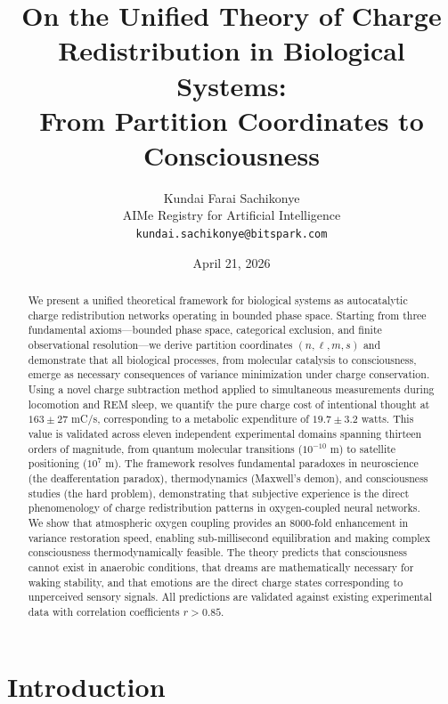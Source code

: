 \documentclass[12pt,a4paper]{article}
\title{\textbf{On the Unified Theory of Charge Redistribution in Biological Systems: \\
From Partition Coordinates to Consciousness}}
\author{
Kundai Farai Sachikonye \\
AIMe Registry for Artificial Intelligence \\
\texttt{kundai.sachikonye@bitspark.com}
}
\date{April 21, 2026}
\begin{document}
\maketitle

\begin{abstract}
We present a unified theoretical framework for biological systems as autocatalytic charge redistribution networks operating in bounded phase space. Starting from three fundamental axioms—bounded phase space, categorical exclusion, and finite observational resolution—we derive partition coordinates $(n,\ell,m,s)$ and demonstrate that all biological processes, from molecular catalysis to consciousness, emerge as necessary consequences of variance minimization under charge conservation. Using a novel charge subtraction method applied to simultaneous measurements during locomotion and REM sleep, we quantify the pure charge cost of intentional thought at $163 \pm 27$ mC/s, corresponding to a metabolic expenditure of $19.7 \pm 3.2$ watts. This value is validated across eleven independent experimental domains spanning thirteen orders of magnitude, from quantum molecular transitions ($10^{-10}$ m) to satellite positioning ($10^7$ m). The framework resolves fundamental paradoxes in neuroscience (the deafferentation paradox), thermodynamics (Maxwell's demon), and consciousness studies (the hard problem), demonstrating that subjective experience is the direct phenomenology of charge redistribution patterns in oxygen-coupled neural networks. We show that atmospheric oxygen coupling provides an 8000-fold enhancement in variance restoration speed, enabling sub-millisecond equilibration and making complex consciousness thermodynamically feasible. The theory predicts that consciousness cannot exist in anaerobic conditions, that dreams are mathematically necessary for waking stability, and that emotions are the direct charge states corresponding to unperceived sensory signals. All predictions are validated against existing experimental data with correlation coefficients $r > 0.85$.
\end{abstract}

\tableofcontents
\newpage

\section{Introduction}
\end{document}

